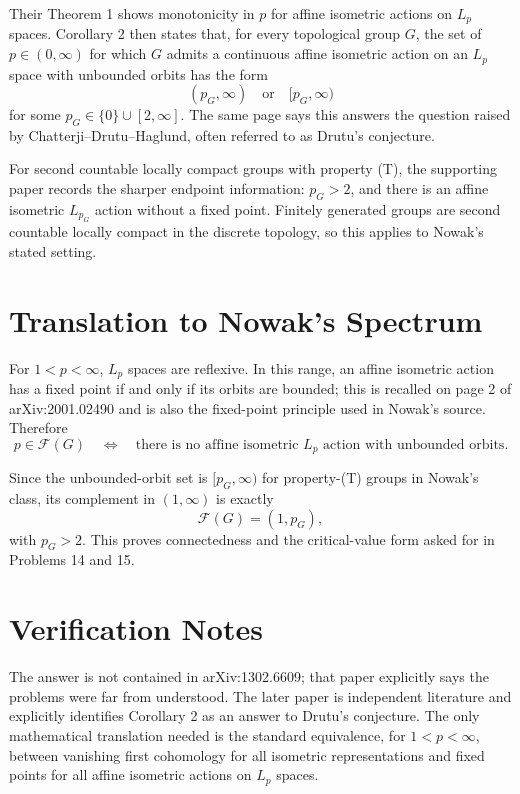 \documentclass[11pt]{article}
\begin{document}
Their Theorem 1 shows monotonicity in $p$ for affine isometric actions on
$L_p$ spaces.  Corollary 2 then states that, for every topological group $G$,
the set of $p\in(0,\infty)$ for which $G$ admits a continuous affine
isometric action on an $L_p$ space with unbounded orbits has the form
\[
  (p_G,\infty) \quad\text{or}\quad [p_G,\infty)
\]
for some $p_G\in\{0\}\cup[2,\infty]$.  The same page says this answers the
question raised by Chatterji--Drutu--Haglund, often referred to as Drutu's
conjecture.

For second countable locally compact groups with property (T), the supporting
paper records the sharper endpoint information: $p_G>2$, and there is an
affine isometric $L_{p_G}$ action without a fixed point.  Finitely generated
groups are second countable locally compact in the discrete topology, so this
applies to Nowak's stated setting.

\section*{Translation to Nowak's Spectrum}

For $1<p<\infty$, $L_p$ spaces are reflexive.  In this range, an affine
isometric action has a fixed point if and only if its orbits are bounded; this
is recalled on page 2 of arXiv:2001.02490 and is also the fixed-point
principle used in Nowak's source.  Therefore
\[
  p\in\mathcal F(G)
  \quad\Longleftrightarrow\quad
  \text{there is no affine isometric }L_p\text{ action with unbounded orbits}.
\]

Since the unbounded-orbit set is $[p_G,\infty)$ for property-(T) groups in
Nowak's class, its complement in $(1,\infty)$ is exactly
\[
  \mathcal F(G)=(1,p_G),
\]
with $p_G>2$.  This proves connectedness and the critical-value form asked
for in Problems 14 and 15.

\section*{Verification Notes}

The answer is not contained in arXiv:1302.6609; that paper explicitly says
the problems were far from understood.  The later paper is independent
literature and explicitly identifies Corollary 2 as an answer to Drutu's
conjecture.  The only mathematical translation needed is the standard
equivalence, for $1<p<\infty$, between vanishing first cohomology for all
isometric representations and fixed points for all affine isometric actions
on $L_p$ spaces.
\end{document}
